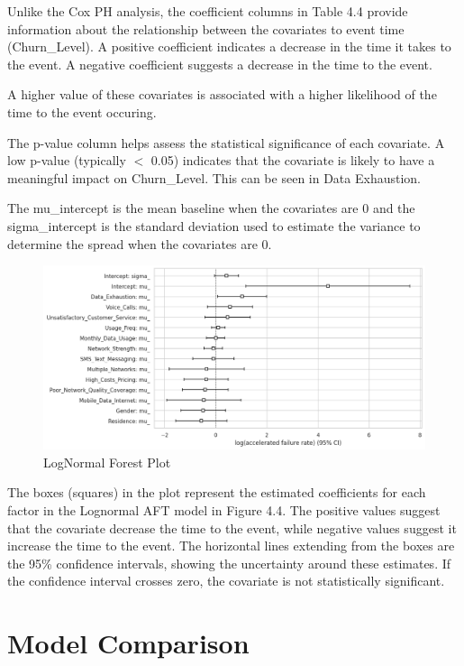 \documentclass[doublespacing]{report} %
\begin{document}
Unlike the Cox PH analysis, the coefficient columns in Table 4.4 provide information about the relationship between the covariates to event time (Churn_Level). A positive coefficient indicates a decrease in the time it takes to the event. A negative coefficient suggests a decrease in the time to the event. 

 A higher value of these covariates is associated with a higher likelihood of the time to the event occuring.
 
The p-value column helps assess the statistical significance of each covariate. A low p-value (typically  \(< \) 0.05) indicates that the covariate is likely to have a meaningful impact on Churn_Level. This can be seen in Data Exhaustion.

The mu_intercept is the mean baseline when the covariates are 0 and the sigma_intercept is the standard deviation used to estimate the variance to determine the spread when the covariates are 0.

\begin{figure}[H]
    \centering
    \includegraphics[width=1\linewidth]{Figure 4/4.4.png}
    \caption{LogNormal Forest Plot}
\end{figure}

The boxes (squares) in the plot represent the estimated coefficients for each factor in the Lognormal AFT model in Figure 4.4. The positive values suggest that the covariate decrease the time to the event, while negative values suggest it increase the time to the event. The horizontal lines extending from the boxes are the 95\% confidence intervals, showing the uncertainty around these estimates. If the confidence interval crosses zero, the covariate is not statistically significant.

\section{Model Comparison}
\end{document}
